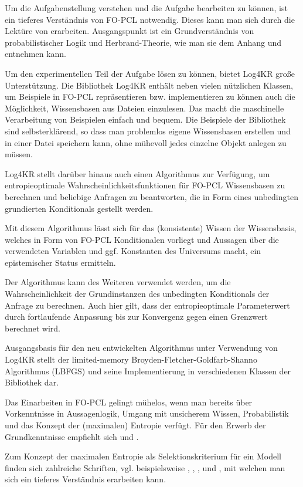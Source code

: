 \documentclass[a4paper, 11pt]{book}
\begin{document}
Um die Aufgabenstellung verstehen und die Aufgabe bearbeiten zu können, ist ein tieferes Verständnis von FO-PCL notwendig. Dieses kann man sich durch die Lektüre von \cite{Fis10} erarbeiten. Ausgangspunkt ist ein Grundverständnis von probabilistischer Logik und Herbrand-Theorie, wie man sie dem Anhang und \cite{BK15} entnehmen kann.


Um den experimentellen Teil der Aufgabe lösen zu können, bietet Log4KR große Unterstützung.
Die Bibliothek Log4KR enthält neben vielen nützlichen Klassen, um Beispiele in FO-PCL repräsentieren bzw. implementieren zu können auch die Möglichkeit, Wissensbasen aus Dateien einzulesen. Das macht die maschinelle Verarbeitung von Beispielen einfach und bequem. Die Beispiele der Bibliothek sind selbsterklärend, so dass man problemlos eigene Wissensbasen erstellen und in einer Datei speichern kann, ohne mühevoll jedes einzelne Objekt anlegen zu müssen.

Log4KR stellt darüber hinaus auch einen Algorithmus zur Verfügung, um entropieoptimale Wahrscheinlichkeitsfunktionen für FO-PCL Wissensbasen zu berechnen und beliebige Anfragen zu beantworten, die in Form eines unbedingten grundierten Konditionals gestellt werden. 

Mit diesem Algorithmus lässt sich für das (konsistente) Wissen der Wissensbasis, welches in Form von FO-PCL Konditionalen vorliegt und Aussagen über die verwendeten Variablen und ggf. Konstanten des Universums macht, ein epistemischer Status ermitteln.

Der Algorithmus kann des Weiteren verwendet werden, um die Wahrscheinlichkeit der Grundinstanzen des unbedingten Konditionals der Anfrage zu berechnen. Auch hier gilt, dass der entropieoptimale Parameterwert durch fortlaufende Anpassung bis zur Konvergenz gegen einen Grenzwert berechnet wird. 

Ausgangsbasis für den neu entwickelten Algorithmus unter Verwendung von Log4KR stellt der limited-memory Broyden-Fletcher-Goldfarb-Shanno Algorithmus (LBFGS) und seine Implementierung in verschiedenen Klassen der Bibliothek dar. 

Das Einarbeiten in FO-PCL gelingt mühelos, wenn man bereits über Vorkenntnisse in Aussagenlogik, Umgang mit unsicherem Wissen, Probabilistik  und das Konzept der (maximalen) Entropie verfügt. Für den Erwerb der Grundkenntnisse empfiehlt sich \cite{BKI08} und \cite{KK06}.

Zum Konzept der maximalen Entropie als Selektionskriterium für ein Modell finden sich zahlreiche Schriften, vgl. beispielsweise \cite{BHM14}, \cite{BK15}, \cite{Fis10}, \cite{RKI97} und \cite{TFLKIB10}, mit welchen man sich ein tieferes Verständnis erarbeiten kann.
\end{document}
